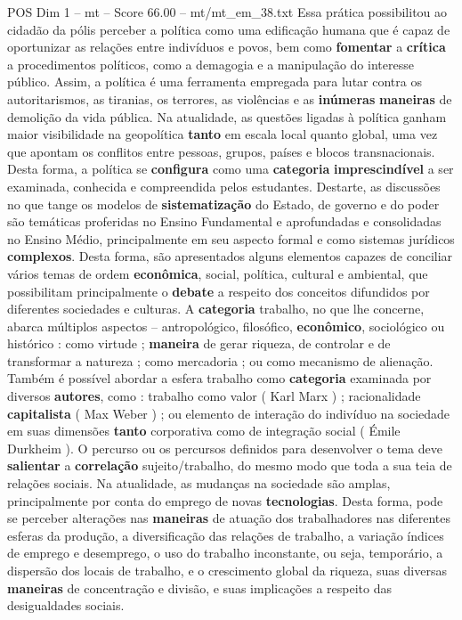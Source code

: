 \begin{textsample}{POS Dim 1 – mt – Score 66.00 – mt/mt\_em\_38.txt}
Essa prática possibilitou ao cidadão da pólis perceber a política como uma edificação humana que é capaz de oportunizar as relações entre indivíduos e povos, bem como \textbf{fomentar} a \textbf{crítica} a procedimentos políticos, como a demagogia e a manipulação do interesse público.
Assim, a política é uma ferramenta empregada para lutar contra os autoritarismos, as tiranias, os terrores, as violências e as \textbf{inúmeras} \textbf{maneiras} de demolição da vida pública.
Na atualidade, as questões ligadas à política ganham maior visibilidade na geopolítica \textbf{tanto} em escala local quanto global, uma vez que apontam os conflitos entre pessoas, grupos, países e blocos transnacionais.
Desta forma, a política se \textbf{configura} como uma \textbf{categoria} \textbf{imprescindível} a ser examinada, conhecida e compreendida pelos estudantes.
Destarte, as discussões no que tange os modelos de \textbf{sistematização} do Estado, de governo e do poder são temáticas proferidas no Ensino Fundamental e aprofundadas e consolidadas no Ensino Médio, principalmente em seu aspecto formal e como sistemas jurídicos \textbf{complexos}.
Desta forma, são apresentados alguns elementos capazes de conciliar vários temas de ordem \textbf{econômica}, social, política, cultural e ambiental, que possibilitam principalmente o \textbf{debate} a respeito dos conceitos difundidos por diferentes sociedades e culturas.
A \textbf{categoria} trabalho, no que lhe concerne, abarca múltiplos aspectos – antropológico, filosófico, \textbf{econômico}, sociológico ou histórico : como virtude ; \textbf{maneira} de gerar riqueza, de controlar e de transformar a natureza ; como mercadoria ; ou como mecanismo de alienação.
Também é possível abordar a esfera trabalho como \textbf{categoria} examinada por diversos \textbf{autores}, como : trabalho como valor ( Karl Marx ) ; racionalidade \textbf{capitalista} ( Max Weber ) ; ou elemento de interação do indivíduo na sociedade em suas dimensões \textbf{tanto} corporativa como de integração social ( Émile Durkheim ).
O percurso ou os percursos definidos para desenvolver o tema deve \textbf{salientar} a \textbf{correlação} sujeito/trabalho, do mesmo modo que toda a sua teia de relações sociais.
Na atualidade, as mudanças na sociedade são amplas, principalmente por conta do emprego de novas \textbf{tecnologias}.
Desta forma, pode se perceber alterações nas \textbf{maneiras} de atuação dos trabalhadores nas diferentes esferas da produção, a diversificação das relações de trabalho, a variação índices de emprego e desemprego, o uso do trabalho inconstante, ou seja, temporário, a dispersão dos locais de trabalho, e o crescimento global da riqueza, suas diversas \textbf{maneiras} de concentração e divisão, e suas implicações a respeito das desigualdades sociais.

\end{textsample}
